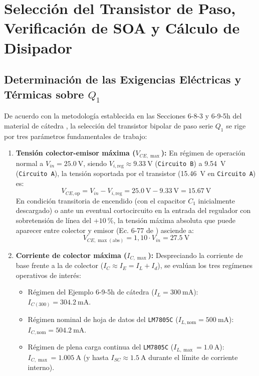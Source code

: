\section{Selección del Transistor de Paso, Verificación de SOA y Cálculo de Disipador}

\subsection{Determinación de las Exigencias Eléctricas y Térmicas sobre $Q_1$}
De acuerdo con la metodología establecida en las Secciones 6-8-3 y 6-9-5h del material de cátedra \cite{gonzalez_p2, gonzalez_p3}, la selección del transistor bipolar de paso serie $Q_1$ se rige por tres parámetros fundamentales de trabajo:
\begin{enumerate}
    \item \textbf{Tensión colector-emisor máxima ($V_{CE,\max}$):} En régimen de operación normal a $V_{in} = \SI{25,0}{\volt}$, siendo $V_{i,\text{reg}} \approx \SI{9,33}{\volt}$ (\texttt{Circuito B}) a \SI{9,54}{\volt} (\texttt{Circuito A}), la tensión soportada por el transistor (\SI{15,46}{\volt} en \texttt{Circuito A}) es:
    \begin{equation}
        V_{CE,\text{op}} = V_{in} - V_{i,\text{reg}} = \SI{25,0}{\volt} - \SI{9,33}{\volt} = \SI{15,67}{\volt}
        \label{eq:vce_op}
    \end{equation}
    En condición transitoria de encendido (con el capacitor $C_1$ inicialmente descargado) o ante un eventual cortocircuito en la entrada del regulador con sobretensión de línea del $+\SI{10}{\percent}$, la tensión máxima absoluta que puede aparecer entre colector y emisor (Ec. 6-77 de \cite{gonzalez_p2}) asciende a:
    \begin{equation}
        V_{CE,\max(\text{abs})} = 1,10 \cdot V_{in} = \SI{27,5}{\volt}
        \label{eq:vce_max_abs}
    \end{equation}

    \item \textbf{Corriente de colector máxima ($I_{C,\max}$):} Despreciando la corriente de base frente a la de colector ($I_C \approx I_E = I_L + I_d$), se evalúan los tres regímenes operativos de interés:
    \begin{itemize}
        \item Régimen del Ejemplo 6-9-5h de cátedra ($I_L = \SI{300}{\milli\ampere}$): $I_{C(300)} = \SI{304,2}{\milli\ampere}$.
        \item Régimen nominal de hoja de datos del \texttt{LM7805C} ($I_{L,\text{nom}} = \SI{500}{\milli\ampere}$): $I_{C,\text{nom}} = \SI{504,2}{\milli\ampere}$.
        \item Régimen de plena carga continua del \texttt{LM7805C} ($I_{L,\max} = \SI{1,0}{\ampere}$): $I_{C,\max} = \SI{1,005}{\ampere}$ (y hasta $I_{SC} \approx \SI{1,5}{\ampere}$ durante el límite de corriente interno).
    \end{itemize}


\end{enumerate}
